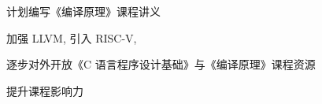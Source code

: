 \begin{frame}{}
  \begin{center}
    计划编写《编译原理》课程讲义


    加强 LLVM, 引入 RISC-V, 
  \end{center}
\end{frame}

\begin{frame}{}
  \begin{center}
    逐步对外开放《C 语言程序设计基础》与《编译原理》课程资源


    \vspace{0.30cm}
    提升课程影响力
  \end{center}
\end{frame}
